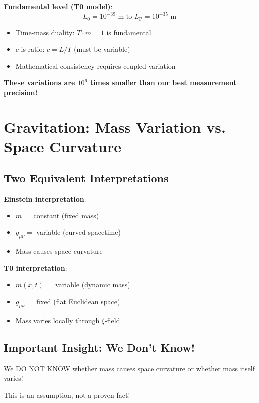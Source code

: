 \documentclass[12pt,a4paper]{article}
\newcommand{\xipar}{\xi}
\newcommand{\Lzero}{L_0}
\newcommand{\Lp}{L_{\text{P}}}
\theoremstyle{definition}
\theoremstyle{remark}
\begin{document}
	\textbf{Fundamental level (T0 model)}:
	\begin{equation}
		\Lzero = 10^{-39} \text{ m to } \Lp = 10^{-35} \text{ m}
	\end{equation}
	
	\begin{itemize}
		\item Time-mass duality: $T \cdot m = 1$ is fundamental
		\item $c$ is ratio: $c = L/T$ (must be variable)
		\item Mathematical consistency requires coupled variation
	\end{itemize}
	
	\textbf{These variations are $10^6$ times smaller than our best measurement precision!}
	
	\section{Gravitation: Mass Variation vs. Space Curvature}
	
	\subsection{Two Equivalent Interpretations}
	
	\textbf{Einstein interpretation}:
	\begin{itemize}
		\item $m = $ constant (fixed mass)
		\item $g_{\mu\nu} = $ variable (curved spacetime)
		\item Mass causes space curvature
	\end{itemize}
	
	\textbf{T0 interpretation}:
	\begin{itemize}
		\item $m(x,t) = $ variable (dynamic mass)
		\item $g_{\mu\nu} = $ fixed (flat Euclidean space)
		\item Mass varies locally through $\xipar$-field
	\end{itemize}
	
	\subsection{Important Insight: We Don't Know!}
	
	\begin{tcolorbox}[colback=red!5!white,colframe=red!75!black,title=Attention - Fundamental Point]
		We DO NOT KNOW whether mass causes space curvature or whether mass itself varies!
		
		This is an assumption, not a proven fact!
	\end{tcolorbox}
	
\end{document}
